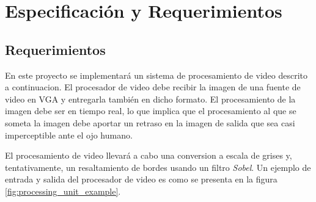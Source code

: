 \documentclass[10pt, letterpaper, conference]{IEEEtran}
\begin{document}
\section{Especificación y Requerimientos}
\label{sec:req}

\subsection{Requerimientos}

En este proyecto se implementará un sistema de procesamiento de video descrito a
continuacion.
El procesador de video debe recibir la imagen de una fuente de video en VGA y 
entregarla también en dicho formato. El procesamiento de la imagen debe 
ser en tiempo real, lo que implica que el procesamiento al que se someta la 
imagen debe aportar un retraso en la imagen de salida que sea casi 
imperceptible ante el ojo humano.

El procesamiento de video llevará a cabo una conversion a escala de grises y, 
tentativamente, un resaltamiento de bordes usando un filtro \emph{Sobel}. 
Un ejemplo de entrada y salida del procesador de video es como se presenta 
en la figura \ref{fig:processing_unit_example}.
\end{document}

